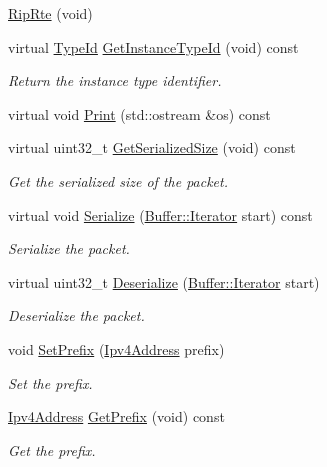 \begin{DoxyCompactItemize}
\item 
\hyperlink{classns3_1_1RipRte_a557fa54ee279b5638ee2cd0a049a40bc}{Rip\+Rte} (void)
\item 
virtual \hyperlink{classns3_1_1TypeId}{Type\+Id} \hyperlink{classns3_1_1RipRte_af67d093c5c208b17cfdb8a5a6b9ca4c6}{Get\+Instance\+Type\+Id} (void) const 
\begin{DoxyCompactList}\small\item\em Return the instance type identifier. \end{DoxyCompactList}\item 
virtual void \hyperlink{classns3_1_1RipRte_a5253a36c196d3a8ac3be0f1468ebab1d}{Print} (std\+::ostream \&os) const 
\item 
virtual uint32\+\_\+t \hyperlink{classns3_1_1RipRte_a1b8a2bdfc0aedcdb9666d5f81676eb3c}{Get\+Serialized\+Size} (void) const 
\begin{DoxyCompactList}\small\item\em Get the serialized size of the packet. \end{DoxyCompactList}\item 
virtual void \hyperlink{classns3_1_1RipRte_abfb9071d7ac51ecd3eee03b1bdde16bb}{Serialize} (\hyperlink{classns3_1_1Buffer_1_1Iterator}{Buffer\+::\+Iterator} start) const 
\begin{DoxyCompactList}\small\item\em Serialize the packet. \end{DoxyCompactList}\item 
virtual uint32\+\_\+t \hyperlink{classns3_1_1RipRte_ac70616e33289e12cd548b28cf8957c58}{Deserialize} (\hyperlink{classns3_1_1Buffer_1_1Iterator}{Buffer\+::\+Iterator} start)
\begin{DoxyCompactList}\small\item\em Deserialize the packet. \end{DoxyCompactList}\item 
void \hyperlink{classns3_1_1RipRte_a3c90b708b76c43b686c76d63fbc7422e}{Set\+Prefix} (\hyperlink{classns3_1_1Ipv4Address}{Ipv4\+Address} prefix)
\begin{DoxyCompactList}\small\item\em Set the prefix. \end{DoxyCompactList}\item 
\hyperlink{classns3_1_1Ipv4Address}{Ipv4\+Address} \hyperlink{classns3_1_1RipRte_ac214c28c81e33aa9e44147e739a8fe0a}{Get\+Prefix} (void) const 
\begin{DoxyCompactList}\small\item\em Get the prefix. \end{DoxyCompactList}\item 

\end{DoxyCompactItemize}
